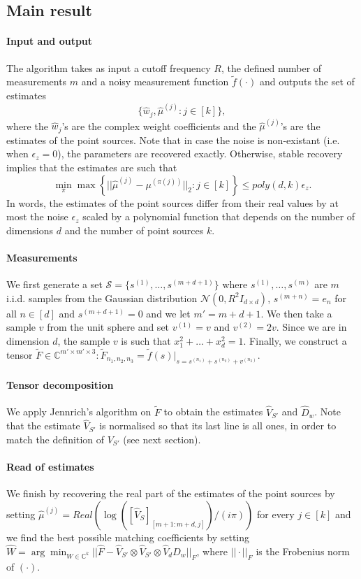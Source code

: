 \subsection{Main result}
\paragraph{Input and output} The algorithm takes as input a cutoff frequency $R$, the defined number of measurements $m$ and a noisy measurement function $\tilde{f}(\cdot)$ and outputs the set of estimates $$\{\widehat{w}_j,\widehat{\mu}^{(j)}:j\in[k]\},$$ where the $\widehat{w}_j$'s are the complex weight coefficients and the $\widehat{\mu}^{(j)}$'s are the estimates of the point sources. Note that in case the noise is non-existant (i.e. when $\epsilon_z=0$), the parameters are recovered exactly. Otherwise, stable recovery implies that the estimates are such that $$\min_\pi\max\left\{||\widehat{\mu}^{(j)}-\mu^{(\pi(j))}||_2:j\in[k]\right\}\leq poly(d,k)\epsilon_z.$$ In words, the estimates of the point sources differ from their real values by at most the noise $\epsilon_z$ scaled by a polynomial function that depends on the number of dimensions $d$ and the number of point sources $k$.
\paragraph{Measurements} We first generate a set $\mathcal{S}=\{s^{(1)},\ldots,s^{(m+d+1)}\}$ where $s^{(1)},\ldots,s^{(m)}$ are $m$ i.i.d. samples from the Gaussian distribution $\mathcal{N}(0,R^2I_{d\times d})$, $s^{(m+n)}=e_n$ for all $n\in[d]$ and $s^{(m+d+1)}=0$ and we let $m'=m+d+1$. We then take a sample $v$ from the unit sphere and set $v^{(1)}=v$ and $v^{(2)}=2v$. Since we are in dimension $d$, the sample $v$ is such that $x_1^2+\ldots+x_d^2=1$. Finally, we construct a tensor $\tilde{F}\in\mathbb{C}^{m'\times m'\times 3}:\tilde{F}_{n_1,n_2,n_3}=\tilde{f}(s)|_{s=s^{(n_1)}+s^{(n_2)}+v^{(n_3)}}$.
\paragraph{Tensor decomposition} We apply Jennrich's algorithm on $\tilde{F}$ to obtain the estimates $\widehat{V}_{S'}$ and $\widehat{D}_w$. Note that the estimate $\widehat{V}_{S'}$ is normalised so that its last line is all ones, in order to match the definition of $V_{S'}$ (see next section).
\paragraph{Read of estimates} We finish by recovering the real part of the estimates of the point sources by setting $\widehat{\mu}^{(j)}=Real(\log([\widehat{V}_S]_{[m+1:m+d,j]})/(i\pi))$ for every $j\in[k]$ and we find the best possible matching coefficients by setting $\widehat{W}=\arg\min_{W\in\mathbb{C}^k}||\widehat{F}-\widehat{V}_{S'}\otimes\widehat{V}_{S'}\otimes \widehat{V}_dD_w||_F$, where $||\cdot||_F$ is the Frobenius norm of $(\cdot)$.

